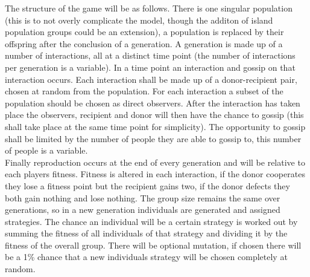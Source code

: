 \documentclass[twoside,twocolumn]{article}
\begin{document}
The structure of the game will be as follows. There is one singular population (this is to not overly complicate the model, though the additon of island population groups could be an extension), a population is replaced by their offspring after the conclusion of a generation. A generation is made up of a number of interactions, all at a distinct time point (the number of interactions per generation is a variable). In a time point an interaction and gossip on that interaction occurs. Each interaction shall be made up of a donor-recipient pair, chosen at random from the population. For each interaction a subset of the population should be chosen as direct observers. After the interaction has taken place the observers, recipient and donor will then have the chance to gossip (this shall take place at the same time point for simplicity). The opportunity to gossip shall be limited by the number of people they are able to gossip to, this number of people is a variable.\\
Finally reproduction occurs at the end of every generation and will be relative to each players fitness. Fitness is altered in each interaction, if the donor cooperates they lose a fitness point but the recipient gains two, if the donor defects they both gain nothing and lose nothing. The group size remains the same over generations, so in a new generation individuals are generated and assigned strategies. The chance an individual will be a certain strategy is worked out by summing the fitness of all individuals of that strategy and dividing it by the fitness of the overall group. There will be optional mutation, if chosen there will be a 1\% chance that a new individuals strategy will be chosen completely at random.
\end{document}
